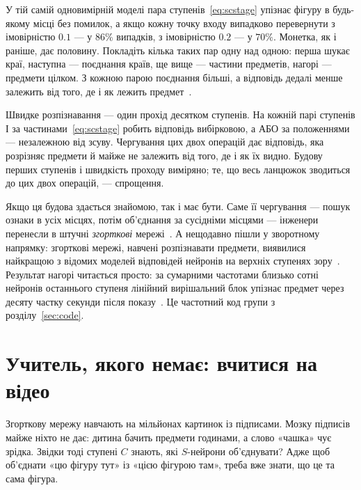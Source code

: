 У тій самій одновимірній моделі пара ступенів~\eqref{eq:scstage} упізнає фігуру в будь-якому місці без помилок, а якщо кожну точку входу випадково перевернути з імовірністю $0.1$ --- у $86\%$ випадків, з імовірністю $0.2$ --- у $70\%$. Монетка, як і раніше, дає половину. Покладіть кілька таких пар одну над одною: перша шукає краї, наступна --- поєднання країв, ще вище --- частини предметів, нагорі --- предмети цілком. З кожною парою поєднання більші, а відповідь дедалі менше залежить від того, де і як лежить предмет~\cite{Riesenhuber1999}.

\begin{keyblock}
\begin{proposition}
\label{prop:conveyor}
Швидке розпізнавання --- один прохід десятком ступенів. На кожній парі ступенів І за частинами~\eqref{eq:scstage} робить відповідь вибірковою, а АБО за положеннями --- незалежною від зсуву. Чергування цих двох операцій дає відповідь, яка розрізняє предмети й майже не залежить від того, де і як їх видно. Будову перших ступенів і швидкість проходу виміряно; те, що весь ланцюжок зводиться до цих двох операцій, --- спрощення.
\end{proposition}
\end{keyblock}

Якщо ця будова здається знайомою, так і має бути. Саме її чергування --- пошук ознаки в усіх місцях, потім об'єднання за сусідніми місцями --- інженери перенесли в штучні \emph{згорткові} мережі~\cite{Fukushima1980}. А нещодавно пішли у зворотному напрямку: згорткові мережі, навчені розпізнавати предмети, виявилися найкращою з відомих моделей відповідей нейронів на верхніх ступенях зору~\cite{Yamins2014}. Результат нагорі читається просто: за сумарними частотами близько сотні нейронів останнього ступеня лінійний вирішальний блок упізнає предмет через десяту частку секунди після показу~\cite{Hung2005}. Це частотний код групи з розділу~\ref{sec:code}.

\section{Учитель, якого немає: вчитися на відео}

Згорткову мережу навчають на мільйонах картинок із підписами. Мозку підписів майже ніхто не дає: дитина бачить предмети годинами, а слово «чашка» чує зрідка. Звідки тоді ступені $C$ знають, які $S$-нейрони об'єднувати? Адже щоб об'єднати «цю фігуру тут» із «цією фігурою там», треба вже знати, що це та сама фігура.

